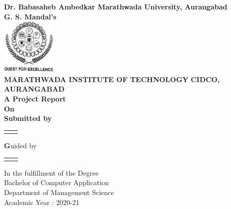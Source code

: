 \begin{titlepage}

\begin{center}
\Large \textbf {Dr. Babasaheb Ambedkar Marathwada University, Aurangabad}\\[0.2in]
\small \textbf{G. S. Mandal’s} \\
\vspace{.1in}
\includegraphics[width=0.20\textwidth]{./mit}\\[0.1in]
\textbf {MARATHWADA INSTITUTE OF TECHNOLOGY}
\textbf{CIDCO, AURANGABAD}\\

\vspace{1cm}
\normalsize \bf A Project Report \\ On \\
\vspace{1cm}
\bf Submitted by \\
\vspace{1cm}
\begin{table}[h]
	\centering
	\begin{tabular}{lr}\hline \\
		
	\end{tabular}
\end{table}

\textbf Guided by \\
\vspace{1cm}
\begin{table}[h]
\centering
\begin{tabular}{lr}\hline \\

\end{tabular}
\end{table}

\vspace{.1in}
\normalsize
In the fulfillment of the Degree\\ Bachelor of Computer Application\\
Department of Management Science \\Academic Year : 2020-21\\[0.2in]


\end{center}

\end{titlepage}
